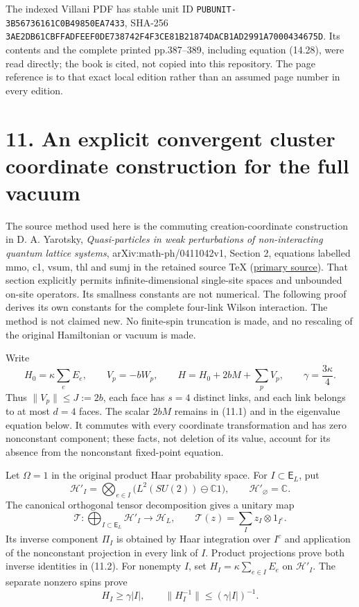 \documentclass[
]{article}
\begin{document}
The indexed Villani PDF has stable unit ID
\nolinkurl{PUBUNIT-3B56736161C0B49850EA7433}, SHA-256
\nolinkurl{3AE2DB61CBFFADFEEF0DE738742F4F3CE81B21874DACB1AD2991A7000434675D}.
Its contents and the complete printed pp.387--389, including equation
(14.28), were read directly; the book is cited, not copied into this
repository. The page reference is to that exact local edition rather
than an assumed page number in every edition.

\section{11. An explicit convergent cluster coordinate construction for
the full
vacuum}\label{an-explicit-convergent-cluster-coordinate-construction-for-the-full-vacuum}

The source method used here is the commuting creation-coordinate
construction in D. A. Yarotsky, \emph{Quasi-particles in weak
perturbations of non-interacting quantum lattice systems},
arXiv:math-ph/0411042v1, Section 2, equations labelled mmo, c1, vsum,
thl and sumj in the retained source TeX
(\href{https://arxiv.org/abs/math-ph/0411042}{primary source}). That
section explicitly permits infinite-dimensional single-site spaces and
unbounded on-site operators. Its smallness constants are not numerical.
The following proof derives its own constants for the complete four-link
Wilson interaction. The method is not claimed new. No finite-spin
truncation is made, and no rescaling of the original Hamiltonian or
vacuum is made.

Write \[
H_0=\kappa\sum_eE_e,\qquad V_p=-bW_p,\qquad
H=H_0+2bM+\sum_pV_p,\qquad \gamma=\frac{3\kappa}{4}.
                                                               \tag{11.1}
\] Thus \(\|V_p\|\le J:=2b\), each face has \(s=4\) distinct links, and
each link belongs to at most \(d=4\) faces. The scalar \(2bM\) remains
in (11.1) and in the eigenvalue equation below. It commutes with every
coordinate transformation and has zero nonconstant component; these
facts, not deletion of its value, account for its absence from the
nonconstant fixed-point equation.

Let \(\Omega=1\) in the original product Haar probability space. For
\(I\subset\mathsf E_L\), put \[
\mathcal H'_I=\bigotimes_{e\in I}
       \bigl(L^2(SU(2))\ominus\mathbb C1\bigr),\qquad
\mathcal H'_\varnothing=\mathbb C.
\] The canonical orthogonal tensor decomposition gives a unitary map \[
\mathcal T:\bigoplus_{I\subset\mathsf E_L}\mathcal H'_I
 \longrightarrow\mathcal H_L,\qquad
\mathcal T(z)=\sum_I z_I\otimes1_{I^c}.                         \tag{11.2}
\] Its inverse component \(\Pi_I\) is obtained by Haar integration over
\(I^c\) and application of the nonconstant projection in every link of
\(I\). Product projections prove both inverse identities in (11.2). For
nonempty \(I\), set \(H_I=\kappa\sum_{e\in I}E_e\) on \(\mathcal H'_I\).
The separate nonzero spins prove \[
H_I\ge\gamma |I|,\qquad
\|H_I^{-1}\|\le(\gamma |I|)^{-1}.                              \tag{11.3}
\]
\end{document}
